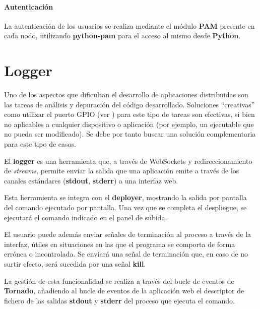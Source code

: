 \paragraph{Autenticación}

La autenticación de los usuarios se realiza mediante el módulo \textbf{PAM} presente en cada nodo\citationneeded{}, utilizando \textbf{python-pam} para el acceso al mismo desde \textbf{Python}\cite{python-am}.


\section{Logger}

Uno de los aspectos que dificultan el desarrollo de aplicaciones distribuidas son las tareas de análisis y depuración del código desarrollado. Soluciones ``creativas'' como utilizar el puerto GPIO (ver \citationneeded) para este tipo de tareas son efectivas, si bien no aplicables a cualquier dispositivo o aplicación (por ejemplo, un ejecutable que no pueda ser modificado). Se debe por tanto buscar una solución complementaria para este tipo de casos.

El \textbf{logger} es una herramienta que, a través de WebSockets y redireccionamiento de \textit{streams}, permite enviar la salida que una aplicación emite a través de los canales estándares (\textbf{stdout}, \textbf{stderr}) a una interfaz web.

Esta herramienta se integra con el \textbf{deployer}, mostrando la salida por pantalla del comando ejecutado por pantalla. Una vez que se completa el despliegue, se ejecutará el comando indicado en el panel de subida.

El usuario puede además enviar señales de terminación al proceso a través de la interfaz, útiles en situaciones en las que el programa se comporta de forma errónea o incontrolada. Se enviará una señal de terminación que, en caso de no surtir efecto, será sucedida por una señal \textbf{kill}. 

La gestión de esta funcionalidad se realiza a través del bucle de eventos de \textbf{Tornado}, añadiendo al bucle de eventos de la aplicación web el descriptor de fichero de las salidas \textbf{stdout} y \textbf{stderr} del proceso que ejecuta el comando.

